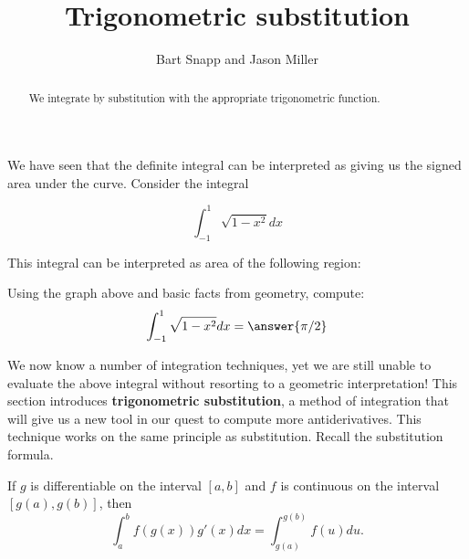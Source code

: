 \documentclass{ximera}
\author{Bart Snapp and Jason Miller}
\title[Dig-In:]{Trigonometric substitution}
\begin{document}
\begin{abstract}
  We integrate by substitution with the appropriate trigonometric
  function.
\end{abstract}
\maketitle

We have seen that the definite integral can be interpreted as giving us the signed area under the curve. Consider the integral 

\[
\int_{-1}^1 \sqrt{1-x^2} dx
\]

 This integral can be interpreted as area of the following region:
\begin{image}
\end{image}

\begin{question}
  Using the graph above and basic facts from geometry, compute:
  \[
  \int_{-1}^1 \sqrt{1-x^2} dx = \answer{\pi/2}
  \]
\end{question}

We now know a number of integration techniques, yet we are still
unable to evaluate the above integral without resorting to a geometric
interpretation!  This section introduces \textbf{trigonometric substitution},
a method of integration that will give us a new tool in our quest to compute more antiderivatives.
This technique works on the same principle as substitution. Recall the
substitution formula.

\begin{theorem} 
If $g$ is differentiable on the interval $[a,b]$ and $f$ is
continuous on the interval $[g(a),g(b)]$, then
\[
\int_a^b f(g(x)) g'(x) dx =\int_{g(a)}^{g(b)} f(u) du.
\]
\end{theorem}
\end{document}
